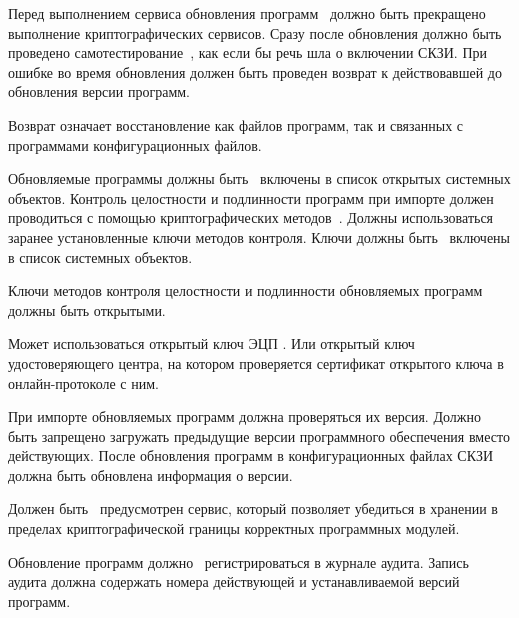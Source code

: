 \label{R.SU.Logic}
Перед выполнением сервиса обновления программ~ 
должно быть прекращено выполнение криптографических сервисов. 
%
Сразу после обновления должно быть проведено 
самотестирование~, 
как если бы речь шла о включении СКЗИ.
%
При ошибке во время обновления должен быть проведен
возврат к действовавшей до обновления версии программ. 

\begin{note}
Возврат означает восстановление как файлов программ, так и связанных с 
программами конфигурационных файлов. 
\end{note}

\label{R.SU.Import}
Обновляемые программы должны быть~ включены в список
открытых системных объектов. Контроль целостности и подлинности программ при
импорте должен проводиться с помощью криптографических
методов~. Должны использоваться заранее установленные ключи
методов контроля. Ключи должны быть~ включены в список
системных объектов.

\label{R.SU.Sig}
Ключи методов контроля целостности и подлинности обновляемых программ должны 
быть открытыми. 

\begin{note}
Может использоваться открытый ключ ЭЦП . Или открытый 
ключ удостоверяющего центра, на котором проверяется сертификат открытого ключа 
 в онлайн-протоколе с ним. 
\end{note}

\label{R.SU.Version}
При импорте обновляемых программ должна проверяться их версия.
Должно быть запрещено загружать предыдущие версии программного обеспечения 
вместо действующих. После обновления программ в конфигурационных файлах СКЗИ
должна быть обновлена информация о версии.

\label{R.SU.PoS}
Должен быть~ предусмотрен сервис, 
который позволяет убедиться в хранении в пределах криптографической границы
корректных программных модулей.

\label{R.SU.AU}
Обновление программ должно~ регистрироваться в 
журнале аудита. 
%
Запись аудита должна содержать номера действующей и устанавливаемой версий 
программ.

